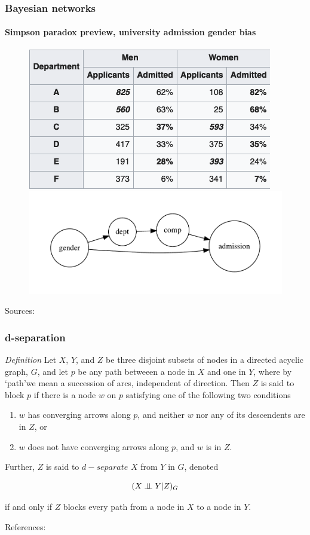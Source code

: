 \begin{frame}
  \frametitle{Bayesian networks}
  \framesubtitle{Simpson paradox preview, university admission gender bias}

  \begin{figure}[ht]
    \centering
            \includegraphics[height=0.35\textheight]{graphics/berkeley_later} 
            \includegraphics[height=0.35\textheight]{graphics/admission_later}
    \end{figure}
    Sources: \cite{simpson-wikipedia} \cite{Bickel398}
\end{frame}


\begin{frame}
\frametitle{d-separation}
\emph{Definition} Let $X$, $Y$, and $Z$ be three disjoint subsets of nodes in a directed acyclic graph, $G$, and let $p$ be any path betweeen a node in $X$ and one in $Y$, where by `path'we mean a succession of arcs, independent of direction. Then $Z$ is said to block $p$ if there is a node $w$ on $p$ satisfying one of the following two conditions

\begin{enumerate}
\item $w$ has converging arrows along $p$, and neither $w$ nor any of its descendents are in $Z$, or
\item $w$ does not have converging arrows along $p$, and $w$ is in $Z$.
\end{enumerate}

Further, $Z$ is said to $d-separate$ $X$ from $Y$ in $G$, denoted 

\begin{equation*}
    (X \perp\!\!\!\perp Y | Z)_G
\end{equation*}

if and only if $Z$ blocks every path from a node in $X$ to a node in $Y$.\newline

References: \cite{pearl1995causal}
\end{frame}


